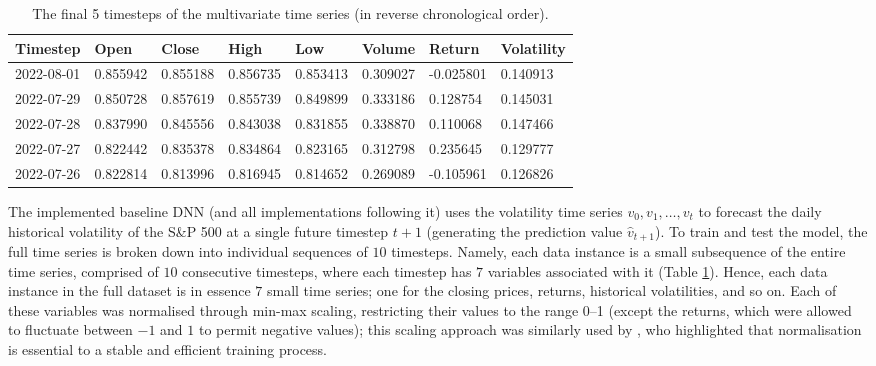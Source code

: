 \documentclass[a4paper, 11pt]{report}
\begin{document}
    \begin{table}[ht]
        \centering
        \label{table: time-series}
        \begin{tabular}{|l|lllllll|} 
            \hline
            \textbf{Timestep} & \textbf{Open} & \textbf{Close} & \textbf{High} & \textbf{Low} & \textbf{Volume} & \textbf{Return} & \textbf{Volatility}  \\ 
            \hline
            2022-08-01 & 0.855942 & 0.855188 & 0.856735 & 0.853413 & 0.309027 & -0.025801 & 0.140913    \\ 
            \hline
            2022-07-29 & 0.850728 & 0.857619 & 0.855739 & 0.849899 & 0.333186 & 0.128754  & 0.145031    \\ 
            \hline
            2022-07-28 & 0.837990 & 0.845556 & 0.843038 & 0.831855 & 0.338870 & 0.110068  & 0.147466    \\ 
            \hline
            2022-07-27 & 0.822442 & 0.835378 & 0.834864 & 0.823165 & 0.312798 & 0.235645  & 0.129777    \\ 
            \hline
            2022-07-26 & 0.822814 & 0.813996 & 0.816945 & 0.814652 & 0.269089 & -0.105961 & 0.126826    \\
            \hline
        \end{tabular}

        \caption{\centering The final 5 timesteps of the multivariate time series (in reverse chronological order).}
    \end{table}


    The implemented baseline DNN (and all implementations following it) uses the volatility time series $v_0, v_1, \ldots, v_t$ to forecast the daily historical volatility of the S\&P 500 at a single future timestep $t+1$ (generating the prediction value $\hat{v}_{t+1}$). To train and test the model, the full time series is broken down into individual sequences of $10$ timesteps. Namely, each data instance is a small subsequence of the entire time series, comprised of $10$ consecutive timesteps, where each timestep has $7$ variables associated with it (Table \ref{table: time-series}). Hence, each data instance in the full dataset is in essence $7$ small time series; one for the closing prices, returns, historical volatilities, and so on. Each of these variables was normalised through min-max scaling, restricting their values to the range 0--1 (except the returns, which were allowed to fluctuate between $-1$ and $1$ to permit negative values); this scaling approach was similarly used by \citet{rodikov-2022}, who highlighted that normalisation is essential to a stable and efficient training process.
\end{document}
